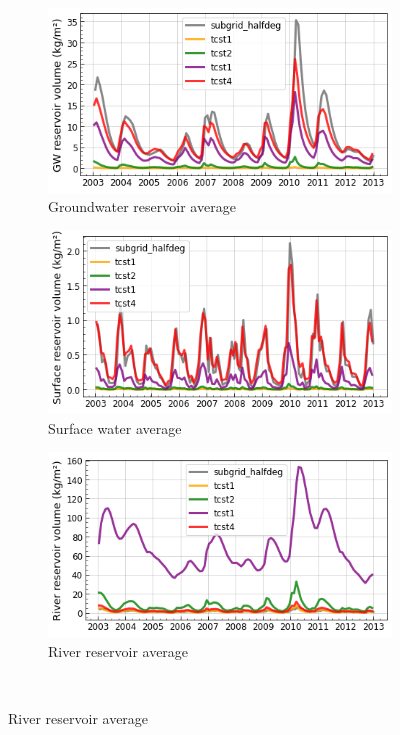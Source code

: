 \begin{figure}[htbp]
    \centering
    \begin{subfigure}[b]{0.32\textwidth}
        \caption{Groundwater reservoir average}
        \includegraphics[width=\linewidth]{images/chap3/time_series/slowr_time_series_tcsts.png}
    \end{subfigure}
    \begin{subfigure}[b]{0.32\textwidth}
        \caption{Surface water average}
        \includegraphics[width=\linewidth]{images/chap3/time_series/fastr_time_series_tcsts.png}
    \end{subfigure}
    \begin{subfigure}[b]{0.32\textwidth}
        \caption{River reservoir average}
        \includegraphics[width=\linewidth]{images/chap3/time_series/streamr_time_series_tcsts.png}
    \end{subfigure} \\


\end{figure}
